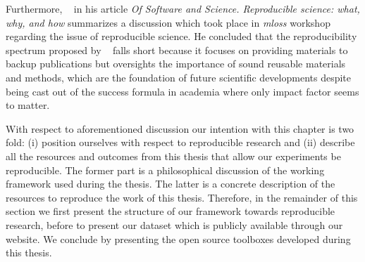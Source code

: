 Furthermore, \citeauthor{varoquaux2015Software}~\cite{varoquaux2015Software} in his article %
\emph{Of Software and Science. Reproducible science: what, why, and how} summarizes a discussion which took place in \emph{\acs{mloss}} workshop regarding the issue of reproducible science.
He concluded that the reproducibility spectrum proposed by \citeauthor{peng2011reproducible}~\cite{peng2011reproducible} falls short because it focuses on providing materials to backup publications but oversights the importance of sound reusable materials and methods, which are the foundation of future scientific developments despite being cast out of the success formula in academia where only impact factor seems to matter.

With respect to aforementioned discussion our intention with this chapter is two fold: (i) position ourselves with respect to reproducible research and (ii) describe all the resources and outcomes from this thesis that allow our experiments be reproducible.
The former part is a philosophical discussion of the working framework used during the thesis. 
The latter is a concrete description of the resources to reproduce the work of this thesis.
Therefore, in the remainder of this section we first present the structure of our framework towards reproducible research, before to present our dataset which is publicly available through our website.
We conclude by presenting the open source toolboxes developed during this thesis.

